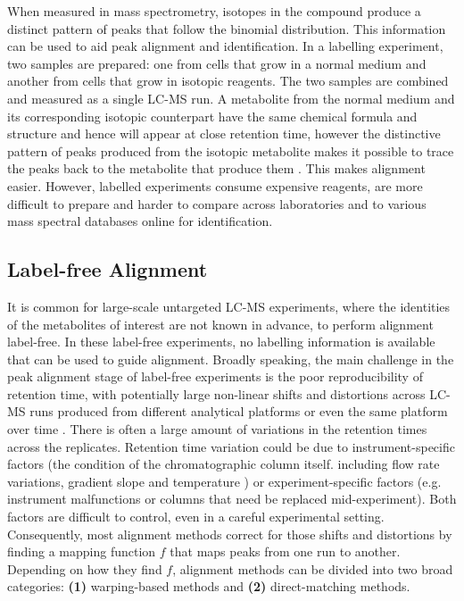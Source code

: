 When measured in mass spectrometry, isotopes in the compound produce a distinct pattern of peaks that follow the binomial distribution. This information can be used to aid peak alignment and identification. In a labelling experiment, two samples are prepared: one from cells that grow in a normal medium and another from cells that grow in isotopic reagents. The two samples are combined and measured as a single LC-MS run. A metabolite from the normal medium and its corresponding isotopic counterpart have the same chemical formula and structure and hence will appear at close retention time, however the distinctive pattern of peaks produced from the isotopic metabolite makes it possible to trace the peaks back to the metabolite that produce them \cite{chokkathukalam2014stable}. This makes alignment easier. However, labelled experiments consume expensive reagents, are more difficult to prepare and harder to compare across laboratories and to various mass spectral databases online for identification. 

\subsection{Label-free Alignment}

It is common for large-scale untargeted LC-MS experiments, where the identities of the metabolites of interest are not known in advance, to perform alignment label-free. In these label-free experiments, no labelling information is available that can be used to guide alignment. Broadly speaking, the main challenge in the peak alignment stage of label-free experiments is the poor reproducibility of retention time, with potentially large non-linear shifts and distortions across LC-MS runs produced from different analytical platforms or even the same platform over time \cite{Podwojski2009}. There is often a large amount of variations in the retention times across the replicates. Retention time variation could be due to instrument-specific factors (the condition of the chromatographic column itself. including flow rate variations, gradient slope and temperature \cite{Christin2008}) or experiment-specific factors (e.g. instrument malfunctions or columns that need be replaced mid-experiment). Both factors are difficult to control, even in a careful experimental setting. Consequently, most alignment methods correct for those shifts and distortions by finding a mapping function $f$ that maps peaks from one run to another. Depending on how they find $f$, alignment methods can be divided into two broad categories: \textbf{(1)} warping-based methods and \textbf{(2)} direct-matching methods.

